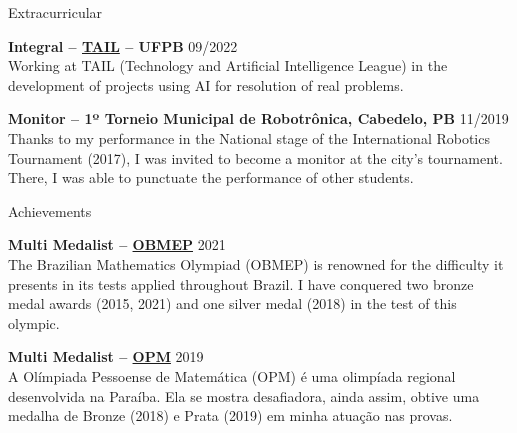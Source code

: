 \documentclass{resume} %
\begin{document}
\begin{rSection}{Extracurricular} \itemsep -1pt {}
	
	\item \textbf{Integral – \href{https://www.instagram.com/tailufpb/}{TAIL} – UFPB} \hfill 09/2022 \\
	Working at TAIL (Technology and Artificial Intelligence League) in the development of projects using AI for resolution of real problems.
	
	\item \textbf{Monitor – 1º Torneio Municipal de Robotrônica, Cabedelo, PB} \hfill 11/2019 \\
	Thanks to my performance in the National stage of the International Robotics Tournament (2017), I was invited to become a monitor at the city's tournament. There, I was able to punctuate the performance of other students. 
\end{rSection}






\begin{rSection}{Achievements}
	
	\item \textbf{Multi Medalist –  \href{http://www.obmep.org.br/}{OBMEP}} \hfill 2021 \\
	The Brazilian Mathematics Olympiad (OBMEP) is renowned for the difficulty it presents in its tests applied throughout Brazil. I have conquered two bronze medal awards (2015, 2021) and one silver medal (2018) in the test of this olympic.
	
	\item \textbf{Multi Medalist – \href{http://www.mat.ufpb.br/opm/}{OPM}} \hfill 2019 \\
	A Olímpiada Pessoense de Matemática (OPM) é uma olimpíada regional desenvolvida na Paraíba. Ela se mostra desafiadora, ainda assim, obtive uma medalha de Bronze (2018) e Prata (2019) em minha atuação nas provas.
	
\end{rSection}
\end{document}
